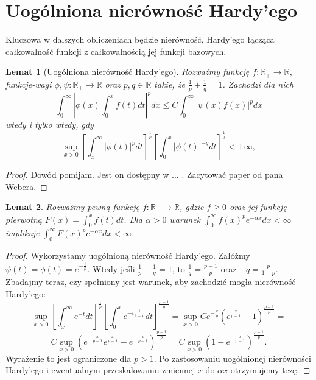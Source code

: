 \documentclass[licencjacka]{pracamgr}
\theoremstyle{definition}
\theoremstyle{definition}
\theoremstyle{plain}
\newtheorem{lemma}{Lemat}[section]
\theoremstyle{plain}
\begin{document}
\section{Uogólniona nierówność Hardy'ego}
Kluczowa w dalszych obliczeniach będzie nierówność, Hardy'ego łącząca całkowalność
funkcji z całkowalnością jej funkcji bazowych.

\begin{lemma}[Uogólniona nierówność Hardy'ego]\label{hardy}
    Rozważmy funkcję $f: \mathbb{R}_{+} \rightarrow \mathbb{R}$, funkcje-wagi
    $\phi, \psi: \mathbb{R}_{+} \rightarrow \mathbb{R}$ oraz $p, q \in
    \mathbb{R}$ takie, że $\frac{1}{p} + \frac{1}{q} = 1 $.  Zachodzi dla nich
$$
\int_0^\infty \left|
                \phi(x) \int_0^x f(t) dt
              \right|^p dx
\leq
C \int_0^\infty \left|
                    \psi(x)  f(x)
                \right|^p dx
$$
wtedy i tylko wtedy, gdy
$$
\sup_{x > 0}
\left[
\int_x^\infty  
   | \phi(t) |^p dt
\right]^{\frac{1}{p}}
\left[
\int_0^x
    | \phi(t) |^{-q} dt
\right]^{\frac{1}{q}} < + \infty,
$$
\end{lemma}
\begin{proof}
    Dowód pomijam. 
    Jest on dostępny w ... . Zacytować paper od pana Webera.
\end{proof}

\begin{lemma}
Rozważmy pewną funkcję $f: \mathbb{R}_{+} \rightarrow \mathbb{R}$, gdzie $f
\geq 0$ oraz jej funkcję pierwotną $F(x) = \int_0^{x} f(t) dt$. Dla $\alpha > 0$ warunek
$\int_0^\infty f(x)^p e^{-\alpha x}dx < \infty$ implikuje $\int_0^\infty
F(x)^pe^{- \alpha x}dx < \infty$.  \\
\end{lemma}
\begin{proof}
Wykorzystamy uogólnioną nierówność Hardy'ego.  Załóżmy $\psi(t) = \phi(t) =
e^{- \frac{t}{p} }$. Wtedy jeśli $\frac{1}{p} + \frac{1}{q} = 1 $, to
$\frac{1}{q} = \frac{p-1}{p}$ oraz $-q = \frac{p}{1-p}$.  Zbadajmy teraz, czy
spełniony jest warunek, aby zachodzić mogła nierówność Hardy'ego:
$$
\sup_{x > 0}
\left[
\int_x^\infty  
    e^{-t} dt
\right]^{\frac{1}{p}}
\left[
\int_0^x
    e^{-t \frac{1}{1-p}} dt
\right]^{\frac{p-1}{p}}
=
\sup_{x > 0}
    C
    e^{- \frac{x}{p}}
    \left(
        e^{\frac{x}{p-1}} - 1
    \right)^{\frac{p-1}{p}}
=
$$
$$
C
\sup_{x > 0}
    \left(
    e^{- \frac{x}{p-1}}
        e^{\frac{x}{p-1}} -
    e^{- \frac{x}{p-1}}
    \right)^{\frac{p-1}{p}}
=
C
\sup_{x > 0}
    \left(
        1 -
    e^{- \frac{x}{p-1}}
    \right)^{\frac{p-1}{p}}. 
$$
Wyrażenie to jest ograniczone dla $p> 1$. Po zastosowaniu uogólnionej
nierówności Hardy'ego i ewentualnym przeskalowaniu zmiennej $x$ do $\alpha x$
otrzymujemy tezę.
\end{proof}
\end{document}
